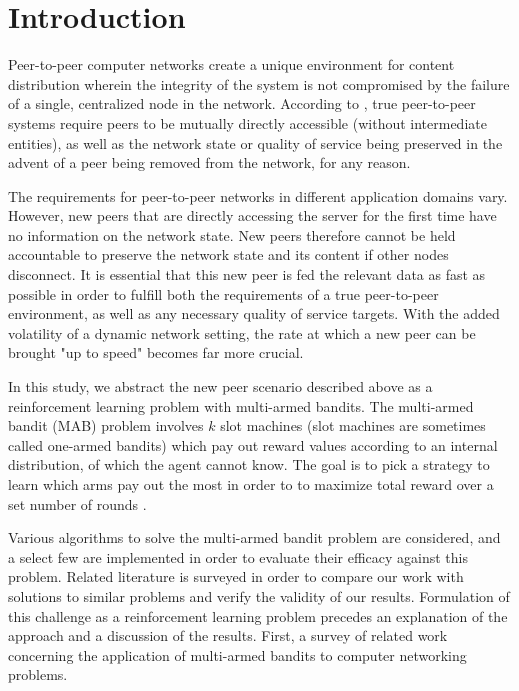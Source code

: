 \documentclass{article}
\begin{document}
\section{Introduction}
Peer-to-peer computer networks create a unique environment for content distribution wherein the integrity of the system is not compromised by the failure of 
a single, centralized node in the network. According to \cite{p2p_def}, true peer-to-peer systems require peers to be mutually directly accessible (without 
intermediate entities), as well as the network state or quality of service being preserved in the advent of a peer being removed from the network, for any 
reason.

The requirements for peer-to-peer networks in different application domains vary. However, new peers that are directly accessing the server for the first time 
have no information on the network state. New peers therefore cannot be held accountable to preserve the network state and its content if other nodes disconnect. 
It is essential that this new peer is fed the relevant data as fast as possible in order to fulfill both the requirements of a true peer-to-peer environment, as 
well as any necessary quality of service targets. With the added volatility of a dynamic network setting, the rate at which a new peer can be brought "up to speed" 
becomes far more crucial.

In this study, we abstract the new peer scenario described above as a reinforcement learning problem with multi-armed bandits. The multi-armed bandit (MAB) problem 
involves $k$ slot machines (slot machines are sometimes called one-armed bandits) which pay out reward values according to an internal distribution, of which the agent 
cannot know. The goal is to pick a strategy to learn which arms pay out the most in order to to maximize total reward over a set number of rounds \cite{mab_algos}. 

Various algorithms to solve the multi-armed bandit problem are considered, and a select few are implemented in order to evaluate their efficacy against this problem. 
Related literature is surveyed in order to compare our work with solutions to similar problems and verify the validity of our results. Formulation of this challenge 
as a reinforcement learning problem precedes an explanation of the approach and a discussion of the results. First, a survey of related work concerning the application 
of multi-armed bandits to computer networking problems.
\end{document}
